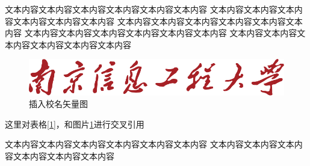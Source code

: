 \documentclass[a4paper,oneside]{ctexbook}
\begin{document}
文本内容文本内容文本内容文本内容文本内容文本内容
文本内容文本内容文本内容文本内容文本内容文本内容
文本内容文本内容文本内容文本内容文本内容文本内容
文本内容文本内容文本内容文本内容文本内容文本内容
文本内容文本内容文本内容文本内容文本内容文本内容

\begin{figure}[h]
    \centering
    \caption{插入校名矢量图}\label{2}
    \includegraphics[scale=0.8]{name.pdf}
\end{figure}

这里对表格\ref{1}，和图片\ref{2}进行交叉引用

文本内容文本内容文本内容文本内容文本内容文本内容
文本内容文本内容文本内容文本内容文本内容文本内容
\end{document}
